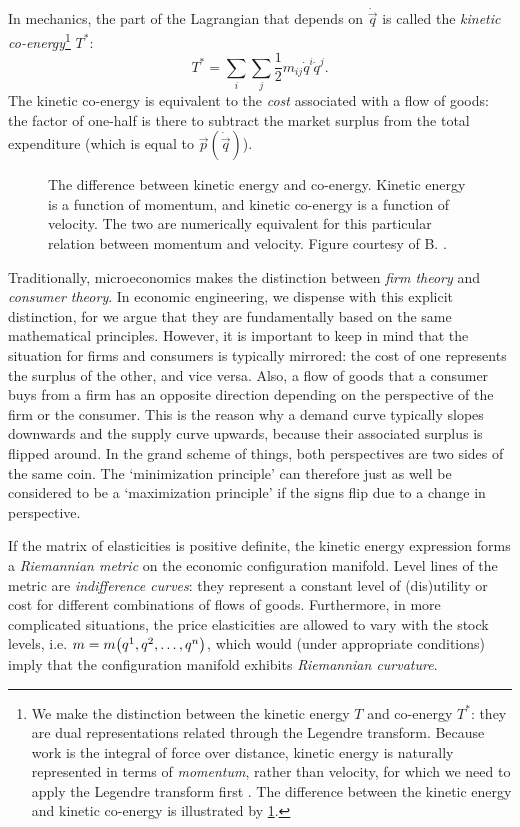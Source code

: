 In mechanics, the part of the Lagrangian that depends on \(\dot{\vec{q}}\) is called the \emph{kinetic co-energy}\footnote{We make the distinction between the kinetic energy \(T\) and co-energy \(T^*\): they are dual representations related through the Legendre transform. Because work is the integral of force over distance, kinetic energy is naturally represented in terms of \emph{momentum}, rather than velocity, for which we need to apply the Legendre transform first \cite{Jeltsema2009}. The difference between the kinetic energy and kinetic co-energy is illustrated by \cref{fig:kinetic_energy}.} \(T^*\):
\begin{equation}
    T^* = \sum_i \sum_j \frac{1}{2}m_{ij}\dot{q}^i \dot{q}^j.
\end{equation} 
The kinetic co-energy is equivalent to the \emph{cost} associated with a flow of goods: the factor of one-half is there to subtract the market surplus from the total expenditure (which is equal to \(\vec{p}(\dot{\vec{q}})\)).

\begin{figure}
    \centering
    
    \caption{The difference between kinetic energy and co-energy. Kinetic energy is a function of momentum, and kinetic co-energy is a function of velocity. The two are numerically equivalent for this particular relation between momentum and velocity. Figure courtesy of B. \citet{Krabbenborg2021}.}
    \label{fig:kinetic_energy}
\end{figure}

Traditionally, microeconomics makes the distinction between \emph{firm theory} and \emph{consumer theory}. In economic engineering, we dispense with this explicit distinction, for we argue that they are fundamentally based on the same mathematical principles. However, it is important to keep in mind that the situation for firms and consumers is typically mirrored: the cost of one represents the surplus of the other, and vice versa. Also, a flow of goods that a consumer buys from a firm has an opposite direction depending on the perspective of the firm or the consumer. This is the reason why a demand curve typically slopes downwards and the supply curve upwards, because their associated surplus is flipped around. In the grand scheme of things, both perspectives are two sides of the same coin. The `minimization principle' can therefore just as well be considered to be a `maximization principle' if the signs flip due to a change in perspective.

If the matrix of elasticities is positive definite, the kinetic energy expression forms a \emph{Riemannian metric} on the economic configuration manifold. Level lines of the metric are \emph{indifference curves}: they represent a constant level of (dis)utility or cost for different combinations of flows of goods. Furthermore, in more complicated situations, the price elasticities are allowed to vary with the stock levels, i.e. \( m = m\qty(q^1, q^2, \ldots, q^n)\), which would (under appropriate conditions) imply that the configuration manifold exhibits \emph{Riemannian curvature}.

